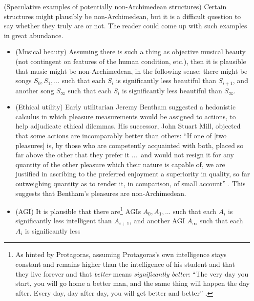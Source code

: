 \documentclass[twoside,11pt]{article}
\begin{document}
\begin{example}
\label{speculativeexamples}
    (Speculative examples of potentially non-Archimedean structures)
    Certain structures might plausibly be non-Archimedean, but it is a difficult
    question to say whether they truly are or not. The reader could come up with
    such examples in great abundance.
    \begin{itemize}
        \item
        (Musical beauty)
        Assuming there is such a thing as objective
        musical beauty (not contingent on features of the human condition, etc.),
        then it is plausible that music might be non-Archimedean, in the following
        sense: there might be songs $S_0,S_1,\ldots$ such that each $S_i$
        is significantly less beautiful than $S_{i+1}$, and another song
        $S_\infty$ such that each $S_i$ is significantly less beautiful than $S_\infty$.
        \item
        (Ethical utility)
        Early utilitarian Jeremy Bentham suggested a hedonistic
        calculus in which pleasure measurements would be assigned to
        actions, to help adjudicate ethical dilemmas.
        His successor, John Stuart Mill, objected that some actions are incomparably
        better than others: ``If one of [two pleasures] is, by those
        who are competently acquainted with both, placed so far above the other that
        they prefer it ...\ and would not resign it for any quantity of the other
        pleasure which their nature is capable of, we are justified in ascribing to
        the preferred enjoyment a superiority in quality, so far outweighing quantity
        as to render it, in comparison, of small account'' \citep{mill}.
        This suggests that Bentham's pleasures are non-Archimedean.
        \item
        (AGI)
        It is plausible that there
        are\footnote{As hinted by Protagoras, assuming Protagoras's own intelligence
        stays constant and remains higher than the intelligence of his student
        and that they live forever and that \emph{better} means \emph{significantly
        better}:
        ``The very day you start, you will go home a better man, and the same thing
        will happen the day after. Every day, day after day, you will get better
        and better'' \citep{protagoras}.} AGIs $A_0,A_1,\ldots$ such that
        each $A_{i}$ is significantly less
        intelligent than $A_{i+1}$, and another AGI $A_\infty$ such that each $A_i$
        is significantly less

\end{itemize}
\end{example}
\end{document}
